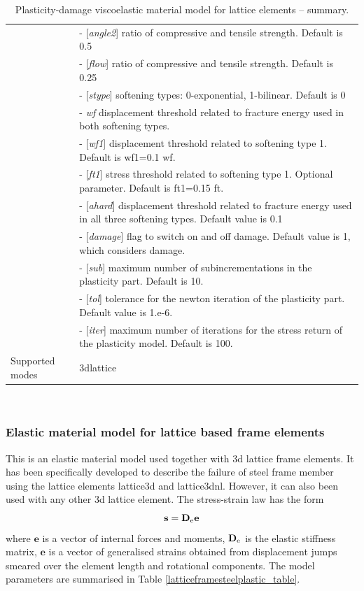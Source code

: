 \documentclass[a4paper]{article}
\newcommand{\param}[1]{{\it #1}}
\newcommand{\optparam}[1]{[{\it #1}]}
\newenvironment{mmt}{\begin{tabular}{|l|p{9cm}|}}{\end{tabular}\\}
\newenvironment{mmt}{\begin{tabular}{|l|l|}}{\end{tabular}\\}
\begin{document}
\begin{table}[!htb]
\begin{mmt}
&- \optparam{angle2} ratio of compressive and tensile strength. Default is 0.5\\
&- \optparam{flow} ratio of compressive and tensile strength. Default is 0.25\\
&- \optparam{stype} softening types: 0-exponential, 1-bilinear. Default is 0\\
&- \param{wf} displacement threshold related to fracture energy used in both softening types.\\
&- \optparam{wf1} displacement threshold related to softening type 1. Default is wf1=0.1 wf.\\
&- \optparam{ft1} stress threshold related to softening type 1. Optional parameter. Default is ft1=0.15 ft.\\
&- \optparam{ahard} displacement threshold related to fracture energy used in all three softening types. Default value is 0.1\\
&- \optparam{damage} flag to switch on and off damage. Default value is 1, which considers damage.\\
&- \optparam{sub} maximum number of subincrementations in the plasticity part. Default is 10.\\
&- \optparam{tol} tolerance for the newton iteration of the plasticity part.  Default value is 1.e-6.\\
&- \optparam{iter} maximum number of iterations for the stress return of the plasticity model. Default is 100.\\
Supported modes & 3dlattice\\
\hline
\end{mmt}
\caption{Plasticity-damage viscoelastic material model for lattice elements -- summary.}
\label{latticeplasticdamageviscoelastic_table}
\end{table}



\subsubsection{Elastic material model for lattice based frame elements}
This is an elastic material model used together with 3d lattice frame elements. It has been specifically developed to describe the failure of steel frame member using the lattice elements lattice3d and lattice3dnl. However, it can also been used with any other 3d lattice element.
The stress-strain law has the form
\begin{equation}
  \mathbf{s} = \mathbf{D}_{\rm e} \mathbf{e}
\end{equation}
where $\mathbf{e}$ is a vector of internal forces and moments, $\mathbf{D}_{\rm e}$ is the elastic stiffness matrix, $\mathbf{e}$ is a vector of generalised strains obtained from displacement jumps smeared over the element length and rotational components. The model parameters are summarised in Table \ref{latticeframesteelplastic_table}.
\end{document}
